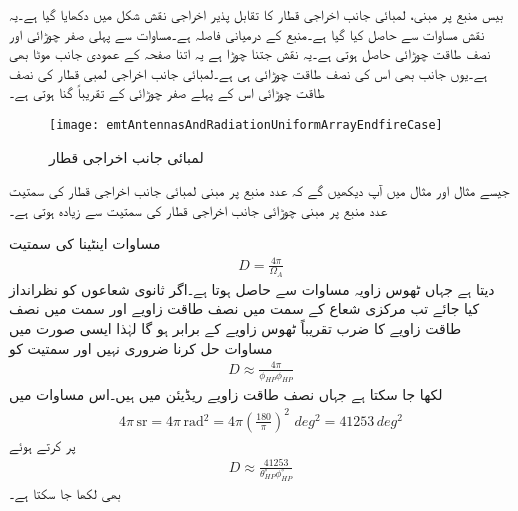 بیس منبع پر مبنی، لمبائی جانب اخراجی قطار کا تقابل پذیر اخراجی نقش شکل  میں دکھایا گیا ہے۔یہ نقش مساوات  سے حاصل کیا گیا ہے۔منبع کے درمیانی فاصلہ  ہے۔مساوات  سے پہلی صفر چوڑائی  اور نصف طاقت چوڑائی  حاصل ہوتی ہے۔یہ نقش جتنا چوڑا ہے یہ اتنا صفحہ کے عمودی جانب موٹا بھی ہے۔یوں  جانب بھی اس کی نصف طاقت چوڑائی  ہی ہے۔لمبائی جانب اخراجی لمبی قطار  کی نصف طاقت چوڑائی اس کے پہلے صفر چوڑائی کے تقریباً  گنا ہوتی ہے۔ 

\begin{figure}
\centering
\texttt{[image: emtAntennasAndRadiationUniformArrayEndfireCase]}
\caption{لمبائی جانب اخراجی قطار}
\label{شکل_اینٹینا_لمبائی_جانب_اخراجی_قطار}
\end{figure}

جیسے مثال  اور مثال  میں آپ دیکھیں گے کہ  عدد منبع پر مبنی لمبائی جانب اخراجی قطار کی سمتیت  عدد منبع پر مبنی چوڑائی جانب اخراجی قطار کی سمتیت سے زیادہ ہوتی ہے۔

مساوات  اینٹینا کی سمتیت 
\begin{align}
D=\frac{4\pi}{\Omega_A} 
\end{align}
دیتا ہے  جہاں ٹھوس زاویہ مساوات  سے حاصل ہوتا ہے۔اگر ثانوی شعاعوں کو نظرانداز کیا جائے تب مرکزی شعاع کے  سمت میں  نصف طاقت زاویے  اور  سمت میں نصف طاقت زاویے   کا ضرب تقریباً ٹھوس زاویے کے برابر ہو گا لہٰذا ایسی صورت میں مساوات  حل کرنا ضروری نہیں اور  سمتیت کو
\begin{align}\label{مساوات_اینٹینا_قطار_سمتیت_الف}
D \approx \frac{4\pi}{\phi_{HP} \phi_{HP}}
\end{align}
لکھا جا سکتا ہے جہاں نصف طاقت زاویے ریڈیئن میں ہیں۔اس مساوات میں
\begin{align*}
4\pi \, \si{\steradian} = 4 \pi \, \si{\radian^2} =4 \pi \left(\frac{180}{\pi} \right)^2 \, \, \si{deg^2}=\num{41253} \, \si{deg^2}
\end{align*}
پر کرتے ہوئے 
\begin{align}\label{مساوات_اینٹینا_قطار_سمتیت_ب}
D \approx \frac{\num{41253}}{\theta^{\circ}_{HP}\phi^{\circ}_{HP}}
\end{align}
بھی لکھا جا سکتا ہے۔

